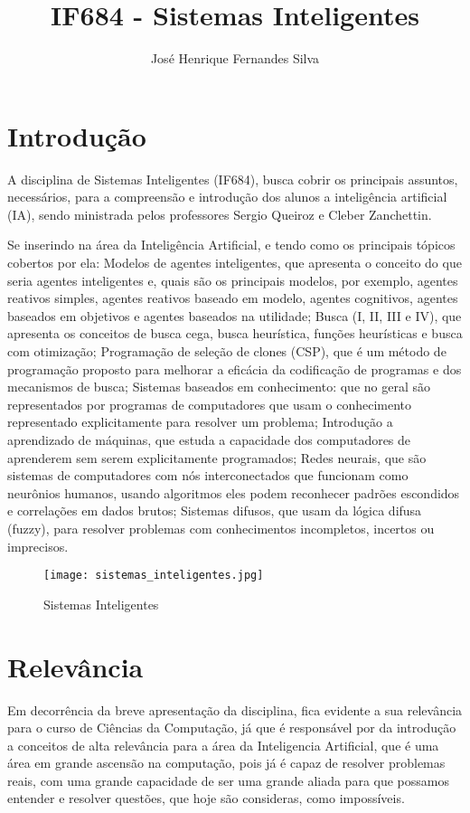 \documentclass{article}
\title{IF684 - Sistemas Inteligentes}
\author{José Henrique Fernandes Silva}
\begin{document}
\maketitle

\section{Introdução}
    A disciplina de Sistemas Inteligentes (IF684), busca cobrir os principais assuntos, necessários, para a compreensão e introdução dos alunos a inteligência artificial (IA), sendo ministrada pelos professores Sergio Queiroz e Cleber Zanchettin.
    \citep{primeira, segunda, terceira}
    
    Se inserindo na área da Inteligência Artificial, e tendo como os principais tópicos cobertos por ela: Modelos de agentes inteligentes, que apresenta o conceito do que seria agentes inteligentes e, quais são os principais modelos, por exemplo, agentes reativos simples, agentes reativos baseado em modelo, agentes cognitivos, agentes baseados em objetivos e agentes baseados na utilidade; Busca (I, II, III e IV), que apresenta os conceitos de busca cega, busca heurística, funções heurísticas e busca com otimização; Programação de seleção de clones (CSP), que é um método de programação proposto para melhorar a eficácia da codificação de programas e dos mecanismos de busca; Sistemas baseados em conhecimento: que no geral são representados por programas de computadores que usam o conhecimento representado explicitamente para resolver um problema; Introdução a aprendizado de máquinas, que estuda a capacidade dos computadores de aprenderem sem serem explicitamente programados; Redes neurais, que são sistemas de computadores com nós interconectados que funcionam como neurônios humanos, usando algoritmos eles podem reconhecer padrões escondidos e correlações em dados brutos; Sistemas difusos, que usam da lógica difusa (fuzzy), para resolver problemas com conhecimentos incompletos, incertos ou imprecisos.
    \cite{primeira, quarta, quinta, sexta, setima, oitava, nona}
    
    \begin{figure}[H]
        \centering
        \texttt{[image: sistemas\_inteligentes.jpg]}
        \caption{Sistemas Inteligentes}
        \label{sistemas_inteligentes}
    \end{figure}

\section{Relevância}
    Em decorrência da breve apresentação da disciplina, fica evidente a sua relevância para o curso de Ciências da Computação, já que é responsável por da introdução a conceitos de alta relevância para a área da Inteligencia Artificial, que é uma área em grande ascensão na computação, pois já é capaz de resolver problemas reais, com uma grande capacidade de ser uma grande aliada para que possamos entender e resolver questões, que hoje são consideras, como impossíveis. 
\end{document}
